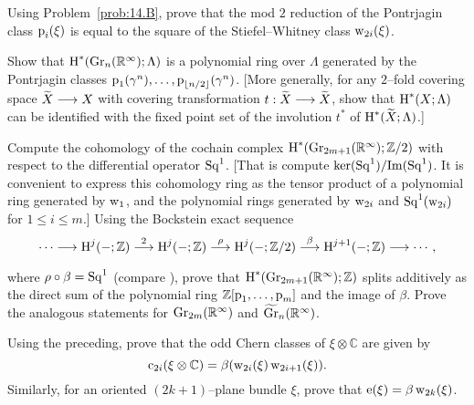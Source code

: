 \documentclass[../main]{subfiles}
\begin{document}
\begin{problem}
\label{prob:15-A}
Using Problem~\ref{prob:14.B}, prove that the mod $2$ reduction of the Pontrjagin class $\operatorname{p}_i(\xi)$ is equal to the square of the Stiefel--Whitney class $\operatorname{w}_{2i}(\xi)$.
\end{problem}

\begin{problem}
\label{prob:15-B}
Show that $\operatorname{H}^\ast(\operatorname{Gr}_n({\mathbb R}^\infty); \Lambda)$ is a polynomial ring over $\Lambda$ generated by the Pontrjagin classes $\operatorname{p}_1(\gamma^n), \ldots, \operatorname{p}_{\lfloor n/2\rfloor}(\gamma^n)$. [More generally, for any $2$--fold covering space ${\xtilde X} \longrightarrow X$ with covering transformation $t : {\xtilde X} \longrightarrow {\xtilde X}$, show that $\operatorname{H}^\ast(X; \Lambda)$ can be identified with the fixed point set of the involution $t^\ast$ of $\homology^\ast({\xtilde X}; \Lambda)$.]
\end{problem}

\begin{problem}
\label{prob:15-C}
Compute the cohomology of the cochain complex \newline $\operatorname{H}^\ast(\operatorname{Gr}_{2m + 1}({\mathbb R}^\infty); {\mathbb Z}/2)$ with respect to the differential operator $\operatorname{Sq}^1$. [That is compute $\ker(\operatorname{Sq}^1)/\mathrm{Im}(\operatorname{Sq}^1)$. It is convenient to express this cohomology ring as the tensor product of a polynomial ring generated by $\operatorname{w}_1$, and the polynomial rings generated by $\operatorname{w}_{2i}$ and $\operatorname{Sq}^1(\operatorname{w}_{2i})$ for $1 \le i \le m$.] Using the Bockstein exact sequence \[\cdots \varrightarrow{} \homology^j(-; \mathbb Z) \varrightarrow{2} \homology^j(-; \mathbb Z) \varrightarrow{\rho} \homology^j(-; {\mathbb Z}/2) \varrightarrow{\beta} \homology^{j + 1}(-; \mathbb Z) \varrightarrow{} \cdots,\] where $\rho \circ \beta = \operatorname{Sq}^1$ (compare \cite[p. 2]{eilenbergsteenrod1952}), prove that $\operatorname{H}^\ast(\operatorname{Gr}_{2m + 1}({\mathbb R}^\infty); \mathbb Z)$ splits additively as the direct sum of the polynomial ring $\mathbb Z[\operatorname{p}_1, \ldots, \operatorname{p}_m]$ and the image of $\beta$. Prove the analogous statements for $\operatorname{Gr}_{2m}({\mathbb R}^\infty)$ and ${\xtilde \grassmannian}_n({\mathbb R}^\infty)$. 
\end{problem}

\begin{problem}
\label{prob:15-D}
Using the preceding, prove that the odd Chern classes of $\xi \otimes \mathbb C$ are given by \[\operatorname{c}_{2i}(\xi \otimes \mathbb C) = \beta(\operatorname{w}_{2i}(\xi)\operatorname{w}_{2i + 1}(\xi)).\] Similarly, for an oriented $(2k + 1)$--plane bundle $\xi$, prove that $\operatorname{e}(\xi) = \beta \operatorname{w}_{2k}(\xi)$. 
\end{problem}
\end{document}
